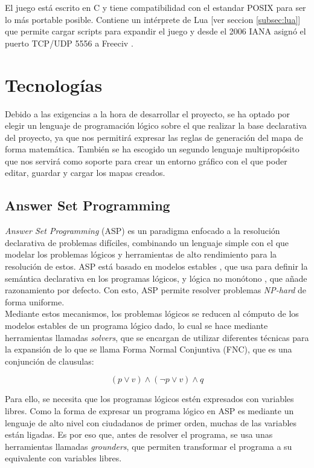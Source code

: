El juego está escrito en C y tiene compatibilidad con el estandar POSIX para ser lo más portable posible. Contiene un intérprete de Lua [ver seccion \ref{subsec:lua}] que permite cargar scripts para expandir el juego y desde el 2006 IANA asignó el puerto TCP/UDP 5556 a Freeciv \cite{iana_2006}.

\section{Tecnologías}

Debido a las exigencias a la hora de desarrollar el proyecto, se ha optado por elegir un lenguaje de programación lógico sobre el que realizar la base declarativa del proyecto, ya que nos permitirá expresar las reglas de generación del mapa de forma matemática. También se ha escogido un segundo lenguaje multipropósito que nos servirá como soporte para crear un entorno gráfico con el que poder editar, guardar y cargar los mapas creados.

\subsection{Answer Set Programming}

\textit{Answer Set Programming} (ASP) es un paradigma enfocado a la resolución declarativa de problemas difíciles, combinando un lenguaje simple con el que modelar los problemas lógicos y herramientas de alto rendimiento para la resolución de estos. ASP está basado en modelos estables \cite{stablemodels}, que usa para definir la semántica declarativa en los programas lógicos, y lógica no monótono \cite{nonmonotonic}, que añade razonamiento por defecto. Con esto, ASP permite resolver problemas \textit{NP-hard} de forma uniforme. \\

Mediante estos mecanismos, los problemas lógicos se reducen al cómputo de los modelos estables de un programa lógico dado, lo cual se hace mediante herramientas llamadas \textit{solvers}, que se encargan de utilizar diferentes técnicas para la expansión de lo que se llama Forma Normal Conjuntiva (FNC), que es una conjunción de clausulas:

\begin{equation}
	(p \lor v) \land (\lnot p \lor v) \land q
\end{equation}

Para ello, se necesita que los programas lógicos estén expresados con variables libres. Como la forma de expresar un programa lógico en ASP es mediante un lenguaje de alto nivel con ciudadanos de primer orden, muchas de las variables están ligadas. Es por eso que, antes de resolver el programa, se usa unas herramientas llamadas \textit{grounders}, que permiten transformar el programa a su equivalente con variables libres. \\

